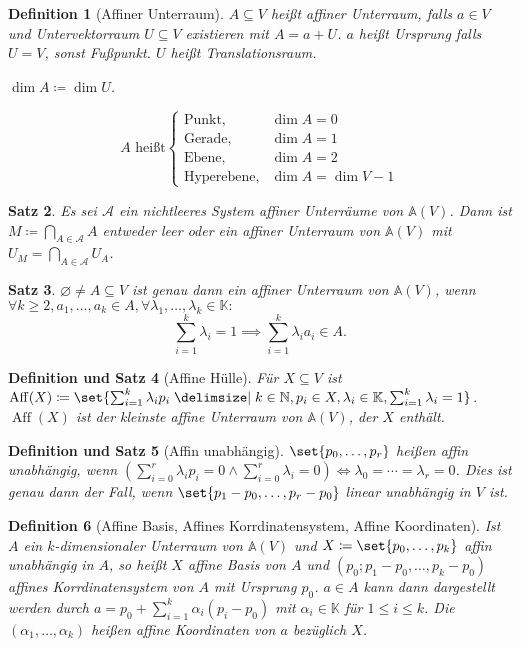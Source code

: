 \documentclass[a4paper]{article}
\newcounter{Sec}
\theoremstyle{marginbreak}
\newtheorem{definition}{Definition}[Sec]
\newtheorem{satz}[definition]{Satz}
\newtheorem{defsatz}[definition]{Definition und Satz}
\DeclareMathOperator{\Aff}{Aff}
\begin{document}
	\begin{definition}[Affiner Unterraum]
		$A\subseteq V$ heißt affiner Unterraum, falls $a\in V$ und Untervektorraum $U\subseteq V$
		existieren mit $A = a + U$. $a$ heißt Ursprung falls $U=V$, sonst Fußpunkt. $U$ heißt
		Translationsraum.

		$\dim A\coloneqq \dim U$.

		\begin{equation*}
			A\text{ heißt}
			\begin{cases}
				\text{Punkt}, &\dim A=0\\
				\text{Gerade}, &\dim A=1\\
				\text{Ebene}, &\dim A=2\\
				\text{Hyperebene}, &\dim A=\dim V - 1
			\end{cases}
		\end{equation*}
	\end{definition}
	\begin{satz}
		Es sei $\mathcal{A}$ ein nichtleeres System affiner Unterräume von $\mathbb{A}(V)$. Dann
		ist $M\coloneqq\bigcap_{A\in\mathcal{A}}A$ entweder leer oder ein affiner Unterraum von
		$\mathbb{A}(V)$ mit $U_M=\bigcap_{A\in\mathcal{A}}U_A$.
	\end{satz}
	\begin{satz}
		$\varnothing\neq A\subseteq V$ ist genau dann ein affiner Unterraum von $\mathbb{A}(V)$, wenn
		$\forall k\geq 2, a_1,\ldots, a_k\in A,\forall\lambda_1,\ldots,\lambda_k\in\mathbb{K}\colon$
		\[\sum_{i=1}^k \lambda_i =1\implies\sum_{i=1}^k\lambda_i a_i\in A.\]
	\end{satz}
	\begin{defsatz}[Affine Hülle]
		Für $X\subseteq V$ ist $\Aff(X)\coloneqq\set{\sum_{i=1}^k\lambda_i p_i\given k\in\mathbb{N}, p_i\in X, \lambda_i\in\mathbb{K}, \sum_{i=1}^k\lambda_i=1}$.
		$\Aff(X)$ ist der kleinste affine Unterraum von $\mathbb{A}(V)$, der $X$ enthält.
	\end{defsatz}
	\begin{defsatz}[Affin unabhängig]
		$\set{p_0,\ldots,p_r}$ heißen affin unabhängig, wenn
		$(\sum_{i=0}^r\lambda_i p_i=0 \wedge \sum_{i=0}^r\lambda_i = 0) \iff \lambda_0 = \cdots = \lambda_r = 0$.
		Dies ist genau dann der Fall, wenn $\set{p_1 - p_0, \ldots, p_r - p_0}$ linear unabhängig in $V$ ist.
	\end{defsatz}
	\begin{definition}[Affine Basis, Affines Korrdinatensystem, Affine Koordinaten]
		Ist $A$ ein $k$-dimensionaler Unterraum von $\mathbb{A}(V)$ und $X\coloneqq\set{p_0,\ldots,p_k}$
		affin unabhängig in $A$, so heißt $X$ affine Basis von $A$ und $(p_0; p_1-p_0, \ldots, p_k - p_0)$
		affines Korrdinatensystem von $A$ mit Ursprung $p_0$. $a\in A$ kann dann dargestellt werden durch
		$a=p_0+\sum_{i=1}^k\alpha_i(p_i-p_0)$ mit $\alpha_i\in\mathbb{K}$ für $1\leq i\leq k$. Die
		$(\alpha_1,\ldots,\alpha_k)$ heißen affine Koordinaten von $a$ bezüglich $X$.
	\end{definition}
\end{document}
